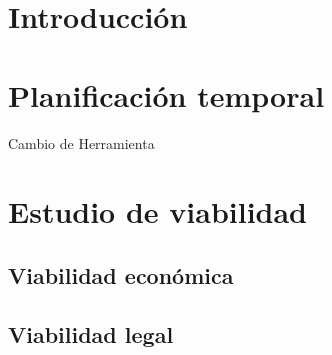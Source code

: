 
\section{Introducción}

\section{Planificación temporal}

Cambio de Herramienta

\section{Estudio de viabilidad}

\subsection{Viabilidad económica}

\subsection{Viabilidad legal}


